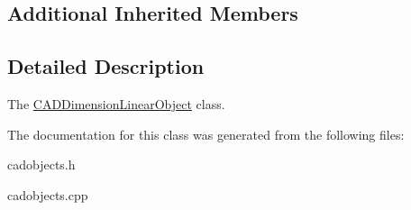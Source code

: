 \subsection*{Additional Inherited Members}


\subsection{Detailed Description}
The \hyperlink{class_c_a_d_dimension_linear_object}{C\+A\+D\+Dimension\+Linear\+Object} class. 

The documentation for this class was generated from the following files\+:\begin{DoxyCompactItemize}
\item 
cadobjects.\+h\item 
cadobjects.\+cpp\end{DoxyCompactItemize}
